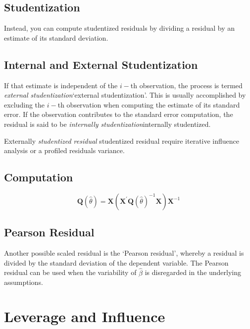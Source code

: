 \subsection{Studentization} %
Instead, you can compute studentized residuals by dividing a residual by an estimate of its standard deviation. 

\subsection{Internal and External Studentization} %
If that estimate is independent of the $i-$th observation, the process is termed \emph{external studentization}`external studentization'. This is usually accomplished by excluding the $i-$th observation when computing the estimate of its standard error. If the observation contributes to the
standard error computation, the residual is said to be \emph{internally studentization}internally studentized.

Externally \emph{studentized residual} studentized residual require iterative influence analysis or a profiled residuals variance.

\subsection{Computation}%


\[ \boldsymbol{Q} (\hat{\theta}) = \boldsymbol{X} ( \boldsymbol{X}^{\prime}\boldsymbol{Q} (\hat{\theta})^{-1}\boldsymbol{X})\boldsymbol{X}^{-1} \]

\subsection{Pearson Residual}%

Another possible scaled residual is the  `Pearson residual', whereby a residual is divided by the standard deviation of the dependent variable. The Pearson residual can be used when the variability of $\hat{\beta}$ is disregarded in the underlying assumptions.


\newpage
\section{Leverage and Influence}

